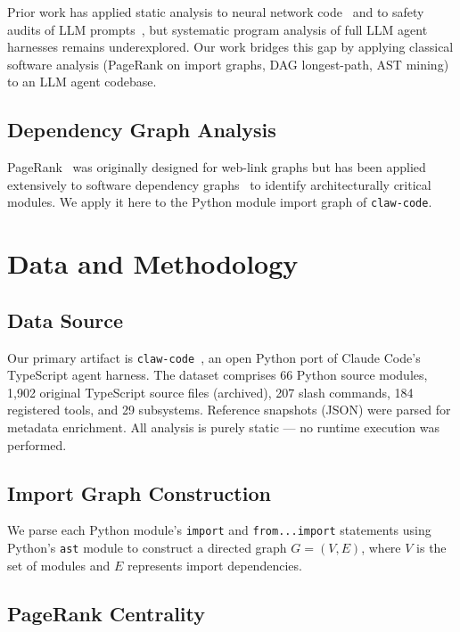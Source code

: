 \documentclass[conference]{IEEEtran}
\begin{document}
Prior work has applied static analysis to neural network
code~\cite{zhang2020static} and to safety audits of LLM
prompts~\cite{perez2022ignore}, but systematic program analysis of
full LLM agent harnesses remains underexplored. Our work bridges this
gap by applying classical software analysis (PageRank on import graphs,
DAG longest-path, AST mining) to an LLM agent codebase.

\subsection{Dependency Graph Analysis}

PageRank~\cite{page1999pagerank} was originally designed for web-link
graphs but has been applied extensively to software dependency
graphs~\cite{bavota2014mining} to identify architecturally critical
modules. We apply it here to the Python module import graph of
\texttt{claw-code}.

\section{Data and Methodology}

\subsection{Data Source}

Our primary artifact is \texttt{claw-code}~\cite{instructkr2024clawcode},
an open Python port of Claude Code's TypeScript agent harness. The
dataset comprises 66 Python source modules, 1,902 original TypeScript
source files (archived), 207 slash commands, 184 registered tools, and
29 subsystems. Reference snapshots (JSON) were parsed for metadata
enrichment. All analysis is purely static --- no runtime execution was
performed.

\subsection{Import Graph Construction}

We parse each Python module's \texttt{import} and
\texttt{from...import} statements using Python's \texttt{ast} module
to construct a directed graph $G = (V, E)$, where $V$ is the set of
modules and $E$ represents import dependencies.

\subsection{PageRank Centrality}
\end{document}
